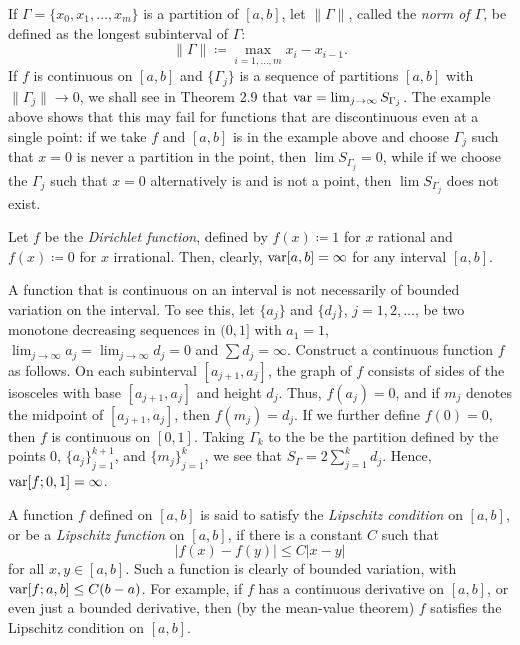 If $\Gamma=\{x_0,x_1,\dotsc,x_m\}$ is a partition of $[a,b]$, let
$\|\Gamma\|$, called the \emph{norm of $\Gamma$}, be defined as the longest
subinterval of $\Gamma$:
\begin{equation}
\label{eq:eq:partition-norm}
\|\Gamma\|\coloneqq\max_{i=1,\dotsc,m} x_i-x_{i-1}.
\end{equation}
If $f$ is continuous on $[a,b]$ and $\{\Gamma_j\}$ is a sequence of
partitions $[a,b]$ with $\|\Gamma_j\|\to 0$, we shall see in Theorem 2.9
that $\operatorname{var}=\lim_{j\to\infty} S_{\Gamma_j}$. The example above shows that this
may fail for functions that are discontinuous even at a single point: if we
take $f$ and $[a,b]$ is in the example above and choose $\Gamma_j$ such
that $x=0$ is never a partition in the point, then $\lim S_{\Gamma_j}=0$,
while if we choose the $\Gamma_j$ such that $x=0$ alternatively is and is
not a point, then $\lim S_{\Gamma_j}$ does not exist.
\begin{example}
Let $f$ be the \emph{Dirichlet function}, defined by $f(x)\coloneqq 1$ for
$x$ rational and $f(x)\coloneqq 0$ for $x$ irrational. Then, clearly,
$\operatorname{var}[a,b]=\infty$ for any interval $[a,b]$.
\end{example}
\begin{example}
A function that is continuous on an interval is not necessarily of bounded
variation on the interval. To see this, let $\{a_j\}$ and $\{d_j\}$,
$j=1,2,\dotsc$, be two monotone decreasing sequences in $(0,1]$ with
$a_1=1$, $\lim_{j\to\infty} a_j=\lim_{j\to\infty} d_j=0$ and $\sum
d_j=\infty$. Construct a continuous function $f$ as follows. On each
subinterval $[a_{j+1},a_j]$, the graph of $f$ consists of sides of the
isosceles with base $[a_{j+1},a_j]$ and height $d_j$. Thus, $f(a_j)=0$, and
if $m_j$ denotes the midpoint of $[a_{j+1},a_j]$, then $f(m_j)=d_j$. If we
further define $f(0)=0$, then $f$ is continuous on $[0,1]$. Taking
$\Gamma_k$ to the be the partition defined by the points $0$,
${\{a_j\}}_{j=1}^{k+1}$, and ${\{m_j\}}_{j=1}^k$, we see that
$S_\Gamma=2\sum_{j=1}^k d_j$. Hence, $\operatorname{var}[f;0,1]=\infty$.
\end{example}
\begin{example}
A function $f$ defined on $[a,b]$ is said to satisfy the \emph{Lipschitz
  condition} on $[a,b]$, or be a \emph{Lipschitz function} on $[a,b]$, if
there is a constant $C$ such that
\[
|f(x)-f(y)|\leq C|x-y|
\]
for all $x,y\in[a,b]$. Such a function is clearly of bounded variation,
with $\operatorname{var}[f;a,b]\leq C(b-a)$. For example, if $f$ has a continuous derivative
on $[a,b]$, or even just a bounded derivative, then (by the mean-value
theorem) $f$ satisfies the Lipschitz condition on $[a,b]$.
\end{example}
